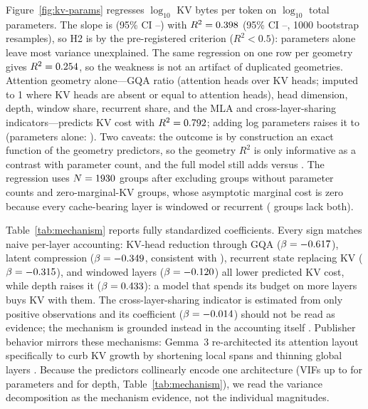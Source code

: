 Figure~\ref{fig:kv-params} regresses $\log_{10}$ KV bytes per token on $\log_{10}$ total parameters. The slope is \kvcParamsSlope{} (95\% CI \kvcParamsSlopeLo--\kvcParamsSlopeHi) with $R^{2}=0.398$ (95\% CI \kvcParamsRsqLo--\kvcParamsRsqHi, 1000 bootstrap resamples), so H2 is \kvcHTwoVerdict{} by the pre-registered criterion ($R^{2}<0.5$): parameters alone leave most variance unexplained. The same regression on one row per geometry gives $R^{2}=0.254$, so the weakness is not an artifact of duplicated geometries. Attention geometry alone---GQA ratio (attention heads over KV heads; imputed to 1 where KV heads are absent or equal to attention heads), head dimension, depth, window share, recurrent share, and the MLA and cross-layer-sharing indicators---predicts KV cost with $R^{2}=0.792$; adding log parameters raises it to \kvcFullRsq{} (parameters alone: \kvcParRsq). Two caveats: the outcome is by construction an exact function of the geometry predictors, so the geometry $R^{2}$ is only informative as a contrast with parameter count, and the full model still adds \kvcFullRsq{} versus \kvcGeomRsq. The regression uses $N=1930{}$ groups after excluding \kvcRegNoParam{} groups without parameter counts and \kvcRegZeroKV{} zero-marginal-KV groups, whose asymptotic marginal cost is zero because every cache-bearing layer is windowed or recurrent (\kvcRegOverlapBoth{} groups lack both).



Table~\ref{tab:mechanism} reports fully standardized coefficients. Every sign matches naive per-layer accounting: KV-head reduction through GQA ($\beta=-0.617$), latent compression ($\beta=-0.349$, consistent with \cite{deepseekai2024v2}), recurrent state replacing KV ($\beta=-0.315$), and windowed layers ($\beta=-0.120$) all lower predicted KV cost, while depth raises it ($\beta=0.433$): a model that spends its budget on more layers buys KV with them. The cross-layer-sharing indicator is estimated from only \kvcSharedN{} positive observations and its coefficient ($\beta=-0.014$) should not be read as evidence; the mechanism is grounded instead in the accounting itself \cite{sun2024yoco,wu2024cla}. Publisher behavior mirrors these mechanisms: Gemma~3 re-architected its attention layout specifically to curb KV growth by shortening local spans and thinning global layers \cite{gemmateam2025gemma3}. Because the predictors collinearly encode one architecture (VIFs up to \kvcVifParams{} for parameters and \kvcVifDepth{} for depth, Table~\ref{tab:mechanism}), we read the variance decomposition as the mechanism evidence, not the individual magnitudes.

